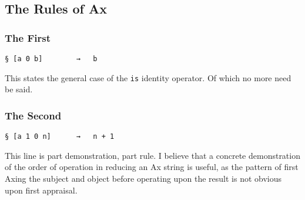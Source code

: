 \documentclass[twoside]{article}
\begin{document}




\subsection{The Rules of Ax}

\subsubsection{The First}

\begin{lstlisting}[style=listingcode]
§ [a 0 b]        →   b
\end{lstlisting}

This states the general case of the \texttt{is} identity operator. Of which no more need be said.

\subsubsection{The Second}

\begin{lstlisting}[style=listingcode]
§ [a 1 0 n]      →   n + 1
\end{lstlisting}

This line is part demonstration, part rule. I believe that a concrete demonstration of the order of operation in reducing an Ax string is useful, as the pattern of first Axing the subject and object before operating upon the result is not obvious upon first appraisal.
\end{document}
